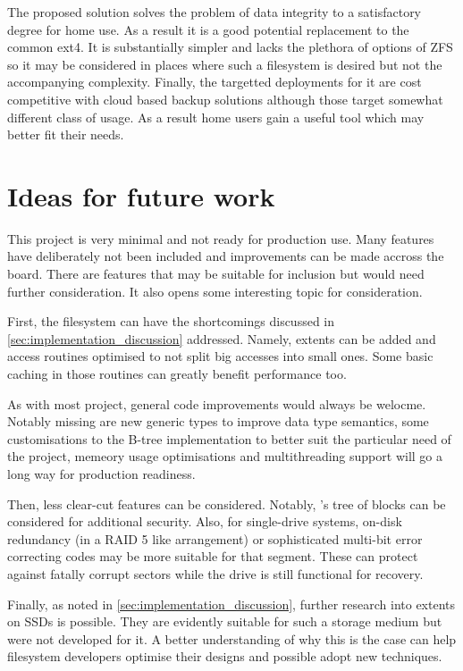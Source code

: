        The proposed solution solves the problem of data integrity to a
        satisfactory degree for home use. As a result it is a good potential
        replacement to the common ext4. It is substantially simpler and lacks
        the plethora of options of ZFS so it may be considered in places where
        such a filesystem is desired but not the accompanying complexity.
        Finally, the targetted deployments for it are cost competitive with
        cloud based backup solutions although those target somewhat different
        class of usage. As a result home users gain a useful tool which may
        better fit their needs.

    \section{Ideas for future work}

        This project is very minimal and not ready for production use. Many
        features have deliberately not been included and improvements can be
        made accross the board. There are features that may be suitable for
        inclusion but would need further consideration. It also opens some
        interesting topic for consideration.

        First, the filesystem can have the shortcomings discussed in
        \autoref{sec:implementation_discussion} addressed. Namely, extents can be
        added and access routines optimised to not split big accesses into
        small ones. Some basic caching in those routines can greatly benefit
        performance too.

        As with most project, general code improvements would always be
        welocme. Notably missing are new generic types to improve data type
        semantics, some customisations to the B-tree implementation to better
        suit the particular need of the project, memeory usage optimisations
        and multithreading support will go a long way for production readiness.

        Then, less clear-cut features can be considered. Notably,
        's tree of blocks can be considered for additional
        security. Also, for single-drive systems, on-disk redundancy (in a RAID
        5 like arrangement) or sophisticated multi-bit error correcting codes
        may be more suitable for that segment. These can protect against
        fatally corrupt sectors while the drive is still functional for
        recovery.


        Finally, as noted in \autoref{sec:implementation_discussion}, further
        research into extents on SSDs is possible. They are evidently suitable
        for such a storage medium but were not developed for it. A better
        understanding of why this is the case can help filesystem developers
        optimise their designs and possible adopt new techniques.
